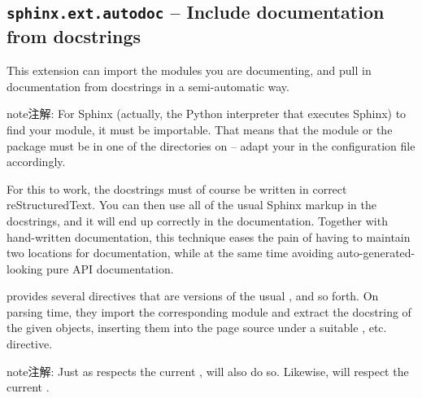 \documentclass[letterpaper,10pt,english]{sphinxmanual}
\begin{document}
\subsection{\texttt{sphinx.ext.autodoc} -- Include documentation from docstrings}
\label{ext/autodoc:module-sphinx.ext.autodoc}\label{ext/autodoc:sphinx-ext-autodoc-include-documentation-from-docstrings}\label{ext/autodoc::doc}
This extension can import the modules you are documenting, and pull in
documentation from docstrings in a semi-automatic way.

\begin{notice}{note}{注解:}
For Sphinx (actually, the Python interpreter that executes Sphinx) to find
your module, it must be importable.  That means that the module or the
package must be in one of the directories on  -- adapt your
 in the configuration file accordingly.
\end{notice}

For this to work, the docstrings must of course be written in correct
reStructuredText.  You can then use all of the usual Sphinx markup in the
docstrings, and it will end up correctly in the documentation.  Together with
hand-written documentation, this technique eases the pain of having to maintain
two locations for documentation, while at the same time avoiding
auto-generated-looking pure API documentation.

 provides several directives that are versions of the usual
{\hyperref[domains:directive\string-py:module]{}}, {\hyperref[domains:directive\string-py:class]{}} and so forth.  On parsing time, they
import the corresponding module and extract the docstring of the given objects,
inserting them into the page source under a suitable {\hyperref[domains:directive\string-py:module]{}},
{\hyperref[domains:directive\string-py:class]{}} etc.  directive.

\begin{notice}{note}{注解:}
Just as {\hyperref[domains:directive\string-py:class]{}} respects the current {\hyperref[domains:directive\string-py:module]{}},
{\hyperref[ext/autodoc:directive\string-autoclass]{}} will also do so.  Likewise, {\hyperref[ext/autodoc:directive\string-automethod]{}} will
respect the current {\hyperref[domains:directive\string-py:class]{}}.
\end{notice}
\end{document}
